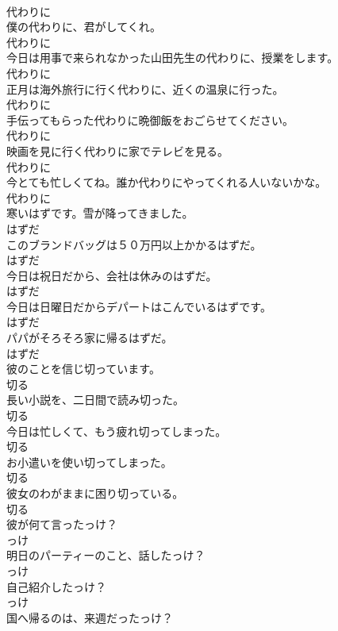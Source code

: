 \documentclass[8pt]{extreport}
\begin{document}
\begin{CJK}{UTF8}{min}
\\	代わりに
\\	僕の代わりに、君がしてくれ。	
\\	代わりに
\\	今日は用事で来られなかった山田先生の代わりに、授業をします。	
\\	代わりに
\\	正月は海外旅行に行く代わりに、近くの温泉に行った。	
\\	代わりに
\\	手伝ってもらった代わりに晩御飯をおごらせてください。	
\\	代わりに
\\	映画を見に行く代わりに家でテレビを見る。	
\\	代わりに
\\	今とても忙しくてね。誰か代わりにやってくれる人いないかな。	
\\	代わりに
\\	寒いはずです。雪が降ってきました。	
\\	はずだ
\\	このブランドバッグは５０万円以上かかるはずだ。	
\\	はずだ
\\	今日は祝日だから、会社は休みのはずだ。	
\\	はずだ
\\	今日は日曜日だからデパートはこんでいるはずです。	
\\	はずだ
\\	パパがそろそろ家に帰るはずだ。	
\\	はずだ
\\	彼のことを信じ切っています。	
\\	切る
\\	長い小説を、二日間で読み切った。	
\\	切る
\\	今日は忙しくて、もう疲れ切ってしまった。	
\\	切る
\\	お小遣いを使い切ってしまった。	
\\	切る
\\	彼女のわがままに困り切っている。	
\\	切る
\\	彼が何て言ったっけ？	
\\	っけ
\\	明日のパーティーのこと、話したっけ？	
\\	っけ
\\	自己紹介したっけ？	
\\	っけ
\\	国へ帰るのは、来週だったっけ？	

\end{CJK}
\end{document}
